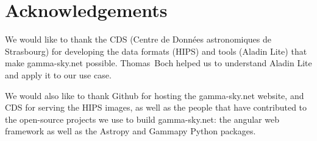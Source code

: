\section{Acknowledgements}

We would like to thank the CDS (Centre de Donn\'{e}es astronomiques de Strasbourg) for developing the data formats (HIPS) and tools (Aladin Lite)
that make gamma-sky.net possible. Thomas~Boch helped us to understand Aladin Lite and apply it to our use case.

We would also like to thank Github for hosting the gamma-sky.net website,
and CDS for serving the HIPS images, as well as the people that have contributed to the open-source projects we use to build gamma-sky.net: the angular web framework as well as the Astropy and Gammapy Python packages.
